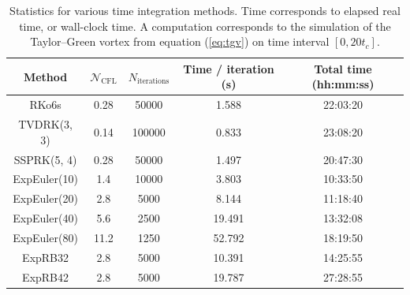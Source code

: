       \begin{table}
        \center
        \begin{tabular}{c|cccc}
          Method       & $\mathcal{N}_\textrm{CFL}$ & $N_\textrm{iterations}$ & Time / iteration (s) & Total time (hh:mm:ss) \\ \hline
          RKo6s        & 0.28                       &                   50000 &                1.588 &             22:03:20  \\
          TVDRK(3, 3)  & 0.14                       &                  100000 &                0.833 &             23:08:20  \\
          SSPRK(5, 4)  & 0.28                       &                   50000 &                1.497 &             20:47:30  \\ \hline
          ExpEuler(10) & 1.4                        &                   10000 &                3.803 &             10:33:50  \\
          ExpEuler(20) & 2.8                        &                    5000 &                8.144 &             11:18:40  \\
          ExpEuler(40) & 5.6                        &                    2500 &               19.491 &             13:32:08  \\
          ExpEuler(80) & 11.2                       &                    1250 &               52.792 &             18:19:50  \\
          ExpRB32      & 2.8                        &                    5000 &               10.391 &             14:25:55  \\
          ExpRB42      & 2.8                        &                    5000 &               19.787 &             27:28:55  \\
        \end{tabular}
        \caption{
          Statistics for various time integration methods.
          Time corresponds to elapsed real time, or wall-clock time.
          A computation corresponds to the simulation of the Taylor--Green vortex from equation (\ref{eq:tgv}) on time interval $\left[0, 20 t_c\right]$.}\label{tab:tgv}
      \end{table}

